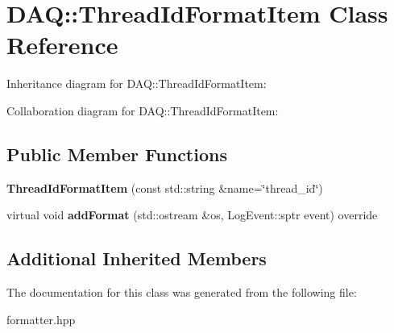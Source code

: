 \hypertarget{classDAQ_1_1ThreadIdFormatItem}{}\section{D\+AQ\+:\+:Thread\+Id\+Format\+Item Class Reference}
\label{classDAQ_1_1ThreadIdFormatItem}


Inheritance diagram for D\+AQ\+:\+:Thread\+Id\+Format\+Item\+:


Collaboration diagram for D\+AQ\+:\+:Thread\+Id\+Format\+Item\+:
\subsection*{Public Member Functions}
\begin{DoxyCompactItemize}
\item 
\mbox{\label{classDAQ_1_1ThreadIdFormatItem_af8e50da69e7343ca4d788fc91510b9c9}} 
{\bfseries Thread\+Id\+Format\+Item} (const std\+::string \&name=\char`\"{}thread\+\_\+id\char`\"{})
\item 
\mbox{\label{classDAQ_1_1ThreadIdFormatItem_a84025b77fe7fa01887e8b1be61f81fcf}} 
virtual void {\bfseries add\+Format} (std\+::ostream \&os, Log\+Event\+::sptr event) override
\end{DoxyCompactItemize}
\subsection*{Additional Inherited Members}


The documentation for this class was generated from the following file\+:\begin{DoxyCompactItemize}
\item 
formatter.\+hpp\end{DoxyCompactItemize}
